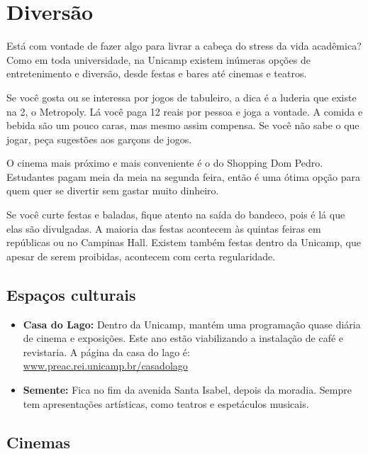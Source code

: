 
\section{Diversão}
Está com vontade de fazer algo para livrar a cabeça do stress da vida acadêmica?
Como em toda universidade, na Unicamp existem inúmeras opções de entretenimento
e diversão, desde festas e bares até cinemas e teatros.

Se você gosta ou se interessa por jogos de tabuleiro, a dica é a luderia que
existe na 2, o Metropoly. Lá você paga 12 reais por pessoa e joga a vontade. A
comida e bebida são um pouco caras, mas mesmo assim compensa. Se você não sabe o
que jogar, peça sugestões aos garçons de jogos.

O cinema mais próximo e mais conveniente é o do Shopping Dom Pedro. Estudantes
pagam meia da meia na segunda feira, então é uma ótima opção para quem quer se
divertir sem gastar muito dinheiro.

Se você curte festas e baladas, fique atento na saída do bandeco, pois é lá que
elas são divulgadas. A maioria das festas acontecem às quintas feiras em
repúblicas ou no Campinas Hall. Existem também festas dentro da Unicamp, que
apesar de serem proibidas, acontecem com certa regularidade.

\subsection{Espaços culturais}

\begin{itemize}
    \item   \textbf{Casa do Lago:} Dentro da Unicamp, mantém uma programação
        quase diária de cinema e exposições. Este ano estão viabilizando a
        instalação de café e revistaria. A página da casa do lago é:
        \\\url{www.preac.rei.unicamp.br/casadolago}

    \item   \textbf{Semente:} Fica no fim da avenida Santa Isabel, depois da
        moradia. Sempre tem apresentações artísticas, como teatros e espetáculos
        musicais.
\end{itemize}

\subsection{Cinemas}

